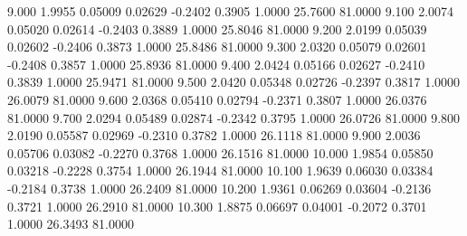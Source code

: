    9.000   1.9955   0.05009   0.02629  -0.2402   0.3905   1.0000  25.7600  81.0000
   9.100   2.0074   0.05020   0.02614  -0.2403   0.3889   1.0000  25.8046  81.0000
   9.200   2.0199   0.05039   0.02602  -0.2406   0.3873   1.0000  25.8486  81.0000
   9.300   2.0320   0.05079   0.02601  -0.2408   0.3857   1.0000  25.8936  81.0000
   9.400   2.0424   0.05166   0.02627  -0.2410   0.3839   1.0000  25.9471  81.0000
   9.500   2.0420   0.05348   0.02726  -0.2397   0.3817   1.0000  26.0079  81.0000
   9.600   2.0368   0.05410   0.02794  -0.2371   0.3807   1.0000  26.0376  81.0000
   9.700   2.0294   0.05489   0.02874  -0.2342   0.3795   1.0000  26.0726  81.0000
   9.800   2.0190   0.05587   0.02969  -0.2310   0.3782   1.0000  26.1118  81.0000
   9.900   2.0036   0.05706   0.03082  -0.2270   0.3768   1.0000  26.1516  81.0000
  10.000   1.9854   0.05850   0.03218  -0.2228   0.3754   1.0000  26.1944  81.0000
  10.100   1.9639   0.06030   0.03384  -0.2184   0.3738   1.0000  26.2409  81.0000
  10.200   1.9361   0.06269   0.03604  -0.2136   0.3721   1.0000  26.2910  81.0000
  10.300   1.8875   0.06697   0.04001  -0.2072   0.3701   1.0000  26.3493  81.0000
